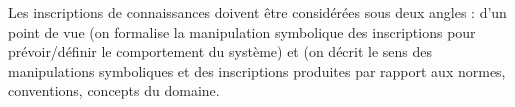 Les inscriptions de connaissances doivent être considérées sous deux angles : d'un point de vue  (on formalise la manipulation symbolique des inscriptions pour prévoir/définir le comportement du système) et  (on décrit le sens des manipulations symboliques et des inscriptions produites par rapport aux normes, conventions, concepts du domaine.









